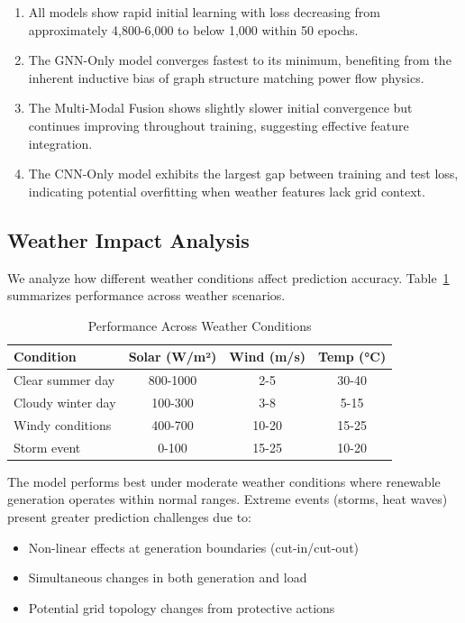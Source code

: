 \documentclass[journal,12pt,onecolumn]{IEEEtran}
\begin{document}
\begin{enumerate}
    \item All models show rapid initial learning with loss decreasing from approximately 4,800-6,000 to below 1,000 within 50 epochs.
    
    \item The GNN-Only model converges fastest to its minimum, benefiting from the inherent inductive bias of graph structure matching power flow physics.
    
    \item The Multi-Modal Fusion shows slightly slower initial convergence but continues improving throughout training, suggesting effective feature integration.
    
    \item The CNN-Only model exhibits the largest gap between training and test loss, indicating potential overfitting when weather features lack grid context.
\end{enumerate}

\subsection{Weather Impact Analysis}

We analyze how different weather conditions affect prediction accuracy. Table~\ref{tab:weather_conditions} summarizes performance across weather scenarios.

\begin{table}[htbp]
\caption{Performance Across Weather Conditions}
\label{tab:weather_conditions}
\centering
\begin{tabular}{lccc}
\toprule
\textbf{Condition} & \textbf{Solar (W/m²)} & \textbf{Wind (m/s)} & \textbf{Temp (°C)} \\
\midrule
Clear summer day & 800-1000 & 2-5 & 30-40 \\
Cloudy winter day & 100-300 & 3-8 & 5-15 \\
Windy conditions & 400-700 & 10-20 & 15-25 \\
Storm event & 0-100 & 15-25 & 10-20 \\
\bottomrule
\end{tabular}
\end{table}

The model performs best under moderate weather conditions where renewable generation operates within normal ranges. Extreme events (storms, heat waves) present greater prediction challenges due to:

\begin{itemize}
    \item Non-linear effects at generation boundaries (cut-in/cut-out)
    \item Simultaneous changes in both generation and load
    \item Potential grid topology changes from protective actions
\end{itemize}
\end{document}
